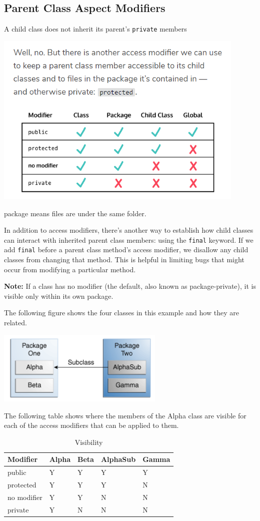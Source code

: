 \documentclass[a4paper, 12pt]{article}
\begin{document}
\subsection{Parent Class Aspect Modifiers}
A child class does not inherit its parent's \verb|private| members

\includegraphics[width=12cm]{pics/accessModifiers.png}

package means files are under the same folder.

In addition to access modifiers, there's another way to establish how child classes can interact with inherited parent class members: using the \verb|final| keyword. If we add \verb|final| before a parent class method's access modifier, we disallow any child classes from changing that method. This is helpful in limiting bugs that might occur from modifying a particular method.

\textbf{Note:} If a class has no modifier (the default, also known as package-private), it is visible only within its own package.

The following figure shows the four classes in this example and how they are related.

\includegraphics[width=8cm]{pics/classes-access.png}

The following table shows where the members of the Alpha class are visible for each of the access modifiers that can be applied to them.
\begin{table}[htbp]
\centering
\caption{Visibility}
\begin{tabular}{lllll}
Modifier & Alpha & Beta & AlphaSub & Gamma \\ \hline
public & Y & Y & Y & Y \\ \hline
protected & Y & Y & Y & N \\ \hline
no modifier & Y & Y & N & N \\ \hline
private & Y & N & N & N \\ \hline
\end{tabular}
\end{table}
\end{document}
